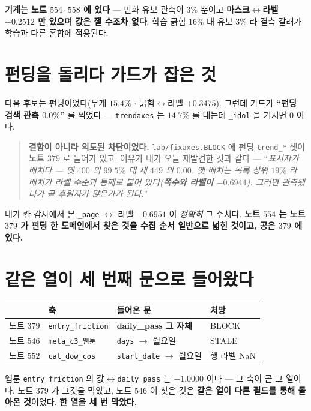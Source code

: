 \documentclass[11pt]{article}
\begin{document}
\textbf{기계는 노트 $554 \cdot 558$ 에 있다} --- 만화 유보 관측이 $3\%$ 뿐이고
\textbf{마스크$\leftrightarrow$라벨 $+0.2512$ 만 있으며 값은 잴 수조차 없다}.
학습 긁힘 $16\%$ 대 유보 $3\%$ 라 결측 갈래가 학습과 다른 혼합에 적용된다.

\section{펀딩을 돌리다 가드가 잡은 것}

다음 후보는 펀딩이었다(무게 $15.4\%$ $\cdot$ 긁힘$\leftrightarrow$라벨
$+0.3475$). 그런데 가드가 \textbf{``펀딩 검색 관측 $0.0\%$''} 를 찍었다
--- \texttt{trendaxes} 는 $14.7\%$ 를 내는데 \texttt{\_idol} 을 거치면 $0$ 이다.

\begin{quote}
\textbf{결함이 아니라 의도된 차단이었다.} \texttt{lab/fixaxes.BLOCK} 에 펀딩
\texttt{trend\_*} 셋이 \textbf{노트 $379$} 로 들어가 있고, 이유가 내가 오늘
재발견한 것과 같다 --- ``\emph{표시자가 배치다 --- 옛 $400$ 의 $99.5\%$ 대 새
$449$ 의 $0.00$. 옛 배치는 목록 상위 $19\%$ 라 배치가 라벨 수준과 통째로 붙어
있다(\textbf{쪽수와 라벨이 $-0.6944$}). 그러면 관측됐나가 곧 후원자가 많은가가
된다.}''
\end{quote}

내가 칸 감사에서 본 \texttt{\_page} $\leftrightarrow$ 라벨 $-0.6951$ 이
\emph{정확히} 그 수치다. \textbf{노트 $554$ 는 노트 $379$ 가 펀딩 한
도메인에서 찾은 것을 수집 순서 일반으로 넓힌 것이고, 공은 $379$ 에 있다.}

\section{같은 열이 세 번째 문으로 들어왔다}

\begin{center}
\begin{tabular}{llll}
\hline
 & 축 & 들어온 문 & 처방 \\
\hline
노트 $379$ & \texttt{entry\_friction} & \textbf{daily\_pass 그 자체} & BLOCK \\
노트 $546$ & \texttt{meta\_c3\_웹툰} & \texttt{days} $\to$ 월요일 & STALE \\
노트 $552$ & \texttt{cal\_dow\_cos} & \texttt{start\_date} $\to$ 월요일 & 행 라벨 NaN \\
\hline
\end{tabular}
\end{center}

웹툰 \texttt{entry\_friction} 의 값$\leftrightarrow$\texttt{daily\_pass} 는
\textbf{$-1.0000$} 이다 --- 그 축이 곧 그 열이다. 노트 $379$ 가 그것을 막았고,
노트 $546$ 이 찾은 것은 \textbf{같은 열이 다른 필드를 통해 돌아온 것}이었다.
\textbf{한 열을 세 번 막았다.}
\end{document}
